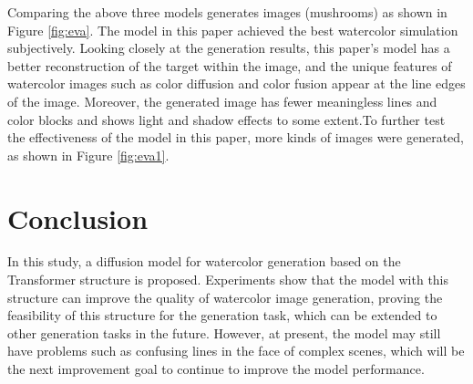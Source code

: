 \documentclass{acsman}
\begin{document}
Comparing the above three models generates images (mushrooms) as shown in Figure \ref{fig:eva}. The model in this paper achieved the best watercolor simulation subjectively. Looking closely at the generation results, this paper's model has a better reconstruction of the target within the image, and the unique features of watercolor images such as color diffusion and color fusion appear at the line edges of the image. Moreover, the generated image has fewer meaningless lines and color blocks and shows light and shadow effects to some extent.To further test the effectiveness of the model in this paper, more kinds of images were generated, as shown in Figure \ref{fig:eva1}.

\section{Conclusion}
In this study, a diffusion model for watercolor generation based on the Transformer structure is proposed. Experiments show that the model with this structure can improve the quality of watercolor image generation, proving the feasibility of this structure for the generation task, which can be extended to other generation tasks in the future. However, at present, the model may still have problems such as confusing lines in the face of complex scenes, which will be the next improvement goal to continue to improve the model performance.




\end{document}
